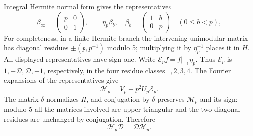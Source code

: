 \documentclass[11pt,a4paper]{article}
\theoremstyle{definition}\newtheorem{definition}[theorem]{Definition}
\theoremstyle{remark}\newtheorem{remark}[theorem]{Remark}
\numberwithin{equation}{section}
\begin{document}
Integral Hermite normal form gives the representatives
\[
 \beta_\infty=\begin{pmatrix}p&0\\0&1\end{pmatrix},
 \qquad
 \eta_p\beta_b,\quad
 \beta_b=\begin{pmatrix}1&b\\0&p\end{pmatrix}\quad(0\le b<p),
\]
For completeness, in a finite Hermite branch the intervening
unimodular matrix has diagonal residues
\(\pm(p,p^{-1})\) modulo 5; multiplying it by \(\eta_p^{-1}\)
places it in \(H\).  All displayed representatives have sign one.
Write \(\mathcal{E}_pf=f|_{-1}\eta_p\).  Thus
\(\mathcal{E}_p\) is \(1,-\mathcal{D},\mathcal{D},-1\), respectively, in
the four residue classes \(1,2,3,4\).
The Fourier expansions of the representatives give
\begin{equation}\label{T:eq:zd-hecke-operator}
 \mathcal{H}_p=V_p+p^2U_p\mathcal{E}_p.
\end{equation}
The matrix \(\delta\) normalizes \(H\), and conjugation by
\(\delta\) preserves \(\mathcal{M}_p\) and its sign:
modulo 5 all the matrices involved are upper triangular and
the two diagonal residues are unchanged by conjugation.
Therefore
\begin{equation}\label{T:eq:zd-commutation}
 \mathcal{H}_p\mathcal{D}=\mathcal{D}\mathcal{H}_p.
\end{equation}
\end{document}
